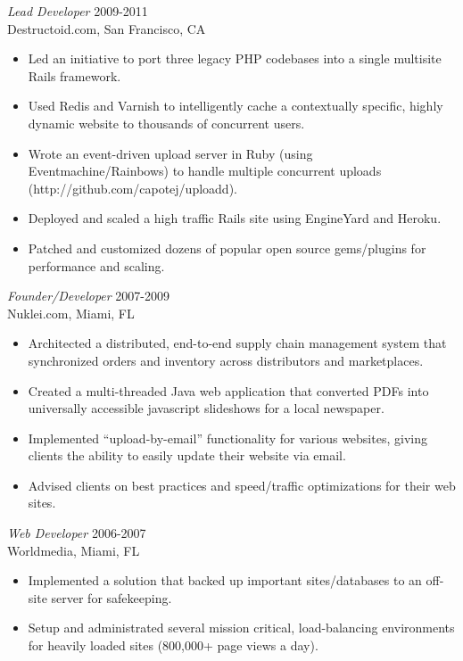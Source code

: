 \documentclass[margin]{res}
\begin{document}
\begin{resume}
\begin{itemize}
  \end{itemize}

  {\sl Lead Developer } \hfill 2009-2011 \\
  Destructoid.com, San Francisco, CA
  \begin{itemize}  \itemsep -2pt %
    \item Led an initiative to port three legacy PHP codebases into a single multisite Rails framework.
    \item Used Redis and Varnish to intelligently cache a contextually specific, highly dynamic website to thousands of concurrent users.
    \item Wrote an event-driven upload server in Ruby (using Eventmachine/Rainbows) to handle multiple concurrent uploads (http://github.com/capotej/uploadd).
    \item Deployed and scaled a high traffic Rails site using EngineYard and Heroku.
    \item Patched and customized dozens of popular open source gems/plugins for performance and scaling.
  \end{itemize}


  {\sl Founder/Developer } \hfill 2007-2009 \\
  Nuklei.com, Miami, FL
  \begin{itemize}  \itemsep -2pt %
    \item Architected a distributed, end-to-end supply chain management system that synchronized orders
      and inventory across distributors and marketplaces.
    \item Created a multi-threaded Java web application that converted PDFs into
      universally accessible javascript slideshows for a local newspaper.
    \item Implemented ``upload-by-email'' functionality for various websites, giving clients the ability to easily
      update their website via email.
    \item Advised clients on best practices and speed/traffic optimizations for their web sites.

  \end{itemize}

  {\sl Web Developer} \hfill 2006-2007 \\
  Worldmedia, Miami, FL
  \begin{itemize}  \itemsep -2pt %
    \item Implemented a solution that backed up important sites/databases
      to an off-site server for safekeeping.
    \item Setup and administrated several mission critical, load-balancing
      environments for heavily loaded sites (800,000+ page views a day).
  \end{itemize}


\end{resume}
\end{document}

